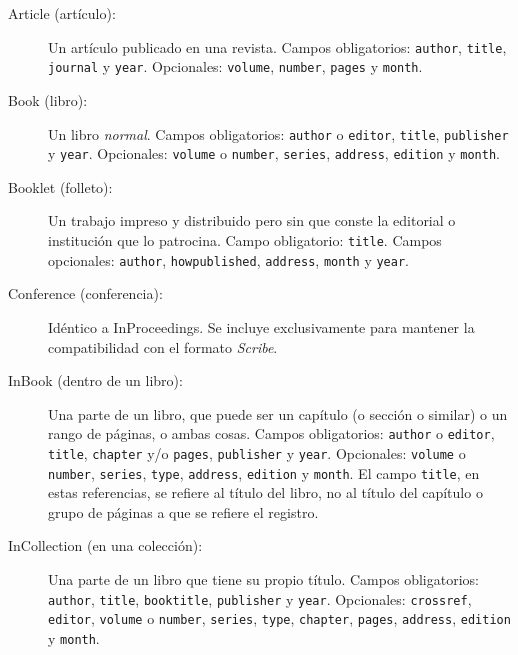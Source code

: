 \documentclass[a4paper,11pt]{article}
\begin{document}
\begin{description}

\item[Article  (artículo):]  Un artículo  publicado  en  una revista.   Campos
  obligatorios:    \texttt{author},    \texttt{title},   \texttt{journal}    y
  \texttt{year}.  Opcionales: \texttt{volume}, \texttt{number}, \texttt{pages}
  y \texttt{month}.

\item[Book   (libro):]   Un   libro   \emph{normal}.    Campos   obligatorios:
  \texttt{author}  o  \texttt{editor},  \texttt{title},  \texttt{publisher}  y
  \texttt{year}.      Opcionales:    \texttt{volume}     o    \texttt{number},
  \texttt{series}, \texttt{address}, \texttt{edi\-tion} y \texttt{month}.

\item[Booklet (folleto):] Un trabajo impreso y distribuido pero sin que conste
  la   editorial  o   institución  que   lo  patrocina.    Campo  obligatorio:
  \texttt{title}.  Campos  opcionales: \texttt{author}, \texttt{howpublished},
  \texttt{address}, \texttt{month} y \texttt{year}.

\item[Conference  (conferencia):]   Idéntico  a  InProceedings.    Se  incluye
  exclusivamente para mantener la compatibilidad con el formato \emph{Scribe}.

\item[InBook (dentro  de un libro):] Una parte  de un libro, que  puede ser un
  capítulo (o sección o similar) o  un rango de páginas, o ambas cosas. Campos
  obligatorios:    \texttt{author}    o    \texttt{editor},    \texttt{title},
  \texttt{chapter}  y/o  \texttt{pages},  \texttt{publisher} y  \texttt{year}.
  Opcionales:    \texttt{volume}     o    \texttt{number},    \texttt{series},
  \texttt{type},  \texttt{address},  \texttt{edition}  y  \texttt{month}.   El
  campo \texttt{title}, en estas referencias,  se refiere al título del libro,
  no al título del capítulo o grupo de páginas a que se refiere el registro.

\item[InCollection (en  una colección):]  Una parte de  un libro que  tiene su
  propio   título.   Campos  obligatorios:   \texttt{author},  \texttt{title},
  \texttt{booktitle},   \texttt{publisher}   y   \texttt{year}.    Opcionales:
  \texttt{crossref},   \texttt{editor},  \texttt{volume}   o  \texttt{number},
  \texttt{series},     \texttt{type},     \texttt{chapter},    \texttt{pages},
  \texttt{address}, \texttt{edition} y \texttt{month}.


\end{description}
\end{document}
